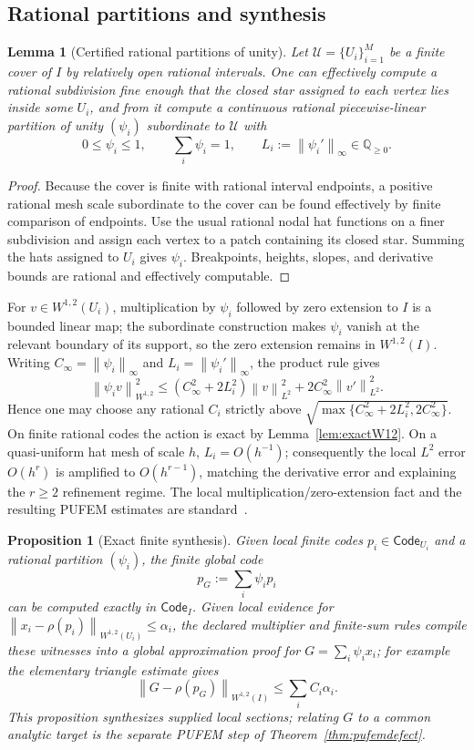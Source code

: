 \documentclass[11pt]{article}
\newtheorem{proposition}[theorem]{Proposition}
\newtheorem{lemma}[theorem]{Lemma}
\theoremstyle{definition}
\newcommand{\norm}[1]{\left\lVert #1 \right\rVert}
\newcommand{\Q}{\mathbb{Q}}
\newcommand{\Code}{\mathsf{Code}}
\begin{document}
\subsection{Rational partitions and synthesis}

\begin{lemma}[Certified rational partitions of unity]\label{lem:rationalPOU}
Let $\mathcal U=\{U_i\}_{i=1}^M$ be a finite cover of $I$ by relatively open rational
intervals.  One can effectively compute a rational subdivision fine enough that the closed star assigned to
each vertex lies inside some $U_i$, and from it compute a continuous rational piecewise-linear
partition of unity $(\psi_i)$ subordinate to $\mathcal U$ with
\[
 0\le\psi_i\le1,
 \qquad \sum_i\psi_i=1,
 \qquad
 L_i:=\norm{\psi_i'}_\infty\in\Q_{\ge0}.
\]
\end{lemma}

\begin{proof}
Because the cover is finite with rational interval endpoints, a positive rational mesh
scale subordinate to the cover can be found effectively by finite comparison of endpoints.
Use the usual rational nodal hat functions on a finer subdivision and assign each vertex to a patch containing
its closed star.  Summing the hats assigned to $U_i$ gives $\psi_i$.  Breakpoints,
heights, slopes, and derivative bounds are rational and effectively computable.
\end{proof}

For $v\in W^{1,2}(U_i)$, multiplication by $\psi_i$ followed by zero extension to $I$ is
a bounded linear map; the subordinate construction makes $\psi_i$ vanish at the relevant
boundary of its support, so the zero extension remains in $W^{1,2}(I)$.  Writing
$C_\infty=\norm{\psi_i}_\infty$ and $L_i=\norm{\psi_i'}_\infty$, the product rule gives
\[
 \norm{\psi_i v}_{W^{1,2}}^2
 \le (C_\infty^2+2L_i^2)\norm v_{L^2}^2
     +2C_\infty^2\norm{v'}_{L^2}^2.
\]
Hence one may choose any rational $C_i$ strictly above
$\sqrt{\max\{C_\infty^2+2L_i^2,2C_\infty^2\}}$.  On finite rational codes the action
is exact by Lemma~\ref{lem:exactW12}.  On a quasi-uniform hat mesh of scale $h$,
$L_i=O(h^{-1})$; consequently the local $L^2$ error $O(h^r)$ is amplified to
$O(h^{r-1})$, matching the derivative error and explaining the $r\ge2$ refinement regime.
The local multiplication/zero-extension fact and the resulting PUFEM estimates are
standard~\cite{MelenkBabuska96,BabuskaMelenk}.

\begin{proposition}[Exact finite synthesis]\label{prop:exactsynth}
Given local finite codes $p_i\in\Code_{U_i}$ and a rational partition $(\psi_i)$, the
finite global code
\[
 p_G:=\sum_i \psi_i p_i
\]
can be computed exactly in $\Code_I$.  Given local evidence for
$\norm{x_i-\rho(p_i)}_{W^{1,2}(U_i)}\le\alpha_i$, the declared multiplier and finite-sum
rules compile these witnesses into a global approximation proof for
$G=\sum_i\psi_i x_i$; for example the elementary triangle estimate gives
\[
 \norm{G-\rho(p_G)}_{W^{1,2}(I)}\le\sum_i C_i\alpha_i.
\]
This proposition synthesizes supplied local sections; relating $G$ to a common analytic
target is the separate PUFEM step of Theorem~\ref{thm:pufemdefect}.
\end{proposition}
\end{document}
